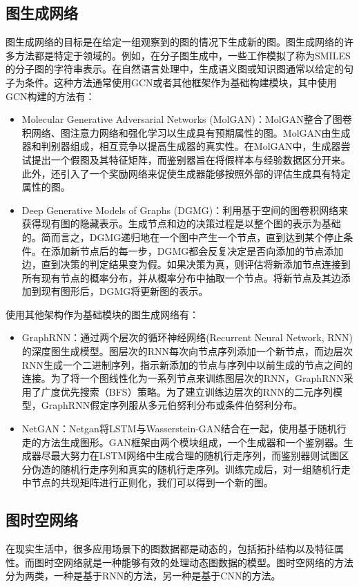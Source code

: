 \subsection{图生成网络}
图生成网络的目标是在给定一组观察到的图的情况下生成新的图。图生成网络的许多方法都是特定于领域的。例如，在分子图生成中，一些工作模拟了称为SMILES的分子图的字符串表示。在自然语言处理中，生成语义图或知识图通常以给定的句子为条件。这种方法通常使用GCN或者其他框架作为基础构建模块，其中使用GCN构建的方法有：
\begin{itemize}
    \item Molecular Generative Adversarial Networks (MolGAN)\cite{de2018molgan}：MolGAN整合了图卷积网络、图注意力网络和强化学习以生成具有预期属性的图。MolGAN由生成器和判别器组成，相互竞争以提高生成器的真实性。在MolGAN中，生成器尝试提出一个假图及其特征矩阵，而鉴别器旨在将假样本与经验数据区分开来。此外，还引入了一个奖励网络来促使生成器能够按照外部的评估生成具有特定属性的图。
    \item Deep Generative Models of Graphs (DGMG)\cite{li2018learning}：利用基于空间的图卷积网络来获得现有图的隐藏表示。生成节点和边的决策过程是以整个图的表示为基础的。简而言之，DGMG递归地在一个图中产生一个节点，直到达到某个停止条件。在添加新节点后的每一步，DGMG都会反复决定是否向添加的节点添加边，直到决策的判定结果变为假。如果决策为真，则评估将新添加节点连接到所有现有节点的概率分布，并从概率分布中抽取一个节点。将新节点及其边添加到现有图形后，DGMG将更新图的表示。
\end{itemize}
使用其他架构作为基础模块的图生成网络有：
\begin{itemize}
    \item GraphRNN\cite{2018GraphRNN}：通过两个层次的循环神经网络(Recurrent Neural Network, RNN)的深度图生成模型。图层次的RNN每次向节点序列添加一个新节点，而边层次RNN生成一个二进制序列，指示新添加的节点与序列中以前生成的节点之间的连接。为了将一个图线性化为一系列节点来训练图层次的RNN，GraphRNN采用了广度优先搜索（BFS）策略。为了建立训练边层次的RNN的二元序列模型，GraphRNN假定序列服从多元伯努利分布或条件伯努利分布。
    \item NetGAN\cite{2018NetGAN}：Netgan将LSTM与Wasserstein-GAN结合在一起，使用基于随机行走的方法生成图形。GAN框架由两个模块组成，一个生成器和一个鉴别器。生成器尽最大努力在LSTM网络中生成合理的随机行走序列，而鉴别器则试图区分伪造的随机行走序列和真实的随机行走序列。训练完成后，对一组随机行走中节点的共现矩阵进行正则化，我们可以得到一个新的图。
\end{itemize}

\subsection{图时空网络}
在现实生活中，很多应用场景下的图数据都是动态的，包括拓扑结构以及特征属性。而图时空网络就是一种能够有效的处理动态图数据的模型。图时空网络的方法分为两类，一种是基于RNN的方法，另一种是基于CNN的方法。

